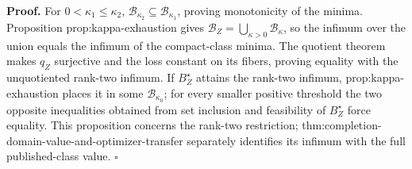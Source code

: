\textbf{Proof.}
For \(0<\kappa_1\le\kappa_2\), \(\mathcal B_{\kappa_2}\subseteq\mathcal B_{\kappa_1}\), proving monotonicity of the minima.  Proposition prop:kappa-exhaustion gives \(\mathcal B_Z=\bigcup_{\kappa>0}\mathcal B_\kappa\), so the infimum over the union equals the infimum of the compact-class minima.  The quotient theorem makes \(q_Z\) surjective and the loss constant on its fibers, proving equality with the unquotiented rank-two infimum.  If \(B_Z^\star\) attains the rank-two infimum, prop:kappa-exhaustion places it in some \(\mathcal B_{\kappa_0}\); for every smaller positive threshold the two opposite inequalities obtained from set inclusion and feasibility of \(B_Z^\star\) force equality.  This proposition concerns the rank-two restriction; thm:completion-domain-value-and-optimizer-transfer separately identifies its infimum with the full published-class value. \(\square\)